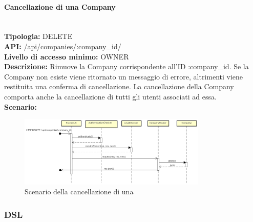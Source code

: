 \newpage
\paragraph{Cancellazione di una Company}\mbox{}\\
\textbf{Tipologia:} DELETE \\
\textbf{API:} /api/companies/:company\_id/ \\
\textbf{Livello di accesso minimo:} OWNER \\
\textbf{Descrizione:} Rimuove la Company corrispondente all'ID :company\_id. Se la Company non esiste viene ritornato un messaggio di errore, altrimenti viene restituita una conferma di cancellazione. La cancellazione della Company comporta anche la cancellazione di tutti gli utenti associati ad essa. \\
\textbf{Scenario:} 
\begin{figure}[H]
\centering
\includegraphics[width=0.8\textwidth]{res/sections/backend/sequence/(DELETE)company.png}
\caption{Scenario della cancellazione di una }
\end{figure}

\newpage
\subsubsection{DSL}
